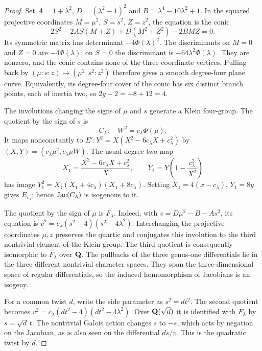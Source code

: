\begin{proof}
Set $A=1+\lambda^2$, $D=(\lambda^2-1)^2$ and
$B=\lambda^4-10\lambda^2+1$.  In the squared projective
coordinates $M=\mu^2$, $S=s^2$, $Z=z^2$, the equation is the conic
\[
 2S^2-2AS(M+Z)+D(M^2+Z^2)-2BMZ=0.
\]
Its symmetric matrix has determinant $-4\Phi(\lambda)^2$.
The discriminants on $M=0$ and $Z=0$ are
$-4\Phi(\lambda)$; on $S=0$ the discriminant is
$-64\lambda^2\Phi(\lambda)$.  They are nonzero, and the
conic contains none of the three coordinate vertices.  Pulling
back by $(\mu:s:z)\mapsto(\mu^2:s^2:z^2)$ therefore gives
a smooth degree-four plane curve.  Equivalently, its degree-four
cover of the conic has six distinct branch points, each of inertia
two, so $2g-2=-8+12=4$.

The involutions changing the signs of $\mu$ and $s$ generate
a Klein four-group.  The quotient by the sign of $s$ is
\[
 C_\lambda:\quad W^2=c_\lambda\Phi(\mu).
\]
It maps nonconstantly to
$E':Y^2=X(X^2-6c_\lambda X+c_\lambda^2)$ by
$(X,Y)=(c_\lambda\mu^2,c_\lambda\mu W)$.
The usual degree-two map
\[
 X_1=\frac{X^2-6c_\lambda X+c_\lambda^2}{X},\qquad
 Y_1=Y\left(1-\frac{c_\lambda^2}{X^2}\right)
\]
has image $Y_1^2=X_1(X_1+4c_\lambda)(X_1+8c_\lambda)$.
Setting $X_1=4(x-c_\lambda)$, $Y_1=8y$ gives
$E_{c_\lambda}$; hence $\operatorname{Jac}(C_\lambda)$ is isogenous to it.

The quotient by the sign of $\mu$ is $F_\lambda$.  Indeed,
with
$v=D\mu^2-B-As^2$, its equation is
$v^2=c_\lambda(s^2-4)(s^2-4\lambda^2)$.
Interchanging the projective coordinates $\mu,z$ preserves the
quartic and conjugates this involution to the third nontrivial
element of the Klein group.  The third quotient is consequently
isomorphic to $F_\lambda$ over $\mathbf Q$.
The pullbacks of the three genus-one differentials lie in the three
different nontrivial character spaces.  They span the three-dimensional
space of regular differentials, so the induced homomorphism of
Jacobians is an isogeny.

For a common twist $d$, write the side parameter as $s^2=d t^2$.
The second quotient becomes
$v^2=c_\lambda(d t^2-4)(d t^2-4\lambda^2)$.
Over $\mathbf Q(\sqrt d)$ it is identified with $F_\lambda$ by
$s=\sqrt d\,t$.  The nontrivial Galois action changes $s$ to
$-s$, which acts by negation on the Jacobian, as is also seen on
the differential $ds/v$.  This is the quadratic twist by $d$.
\end{proof}
